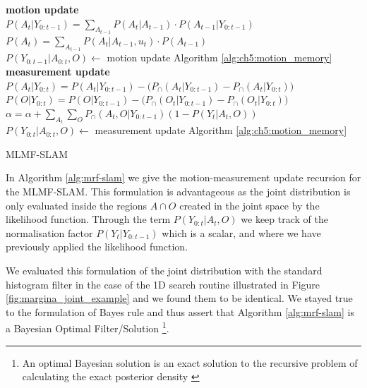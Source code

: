 \begin{center}
\begin{minipage}{\linewidth}

\begin{algorithm}[H]
\label{alg:mrf-slam}
\BlankLine
\textbf{motion update}\\
$P(A_t|Y_{0:t-1})  = \sum\limits_{A_{t-1}} P(A_t|A_{t-1}) \cdot P(A_{t-1}|Y_{0:t-1})$\\
$P(A_t)  = \sum\limits_{A_{t-1}} P(A_t|A_{t-1},u_t) \cdot P(A_{t-1})$\\
$P(Y_{0:t-1}|A_{0:t},O) \gets$ motion update Algorithm \ref{alg:ch5:motion_memory} 
\BlankLine
\textbf{measurement update}
\BlankLine
$P(A_t|Y_{0:t}) = P(A_t|Y_{0:t-1}) - \Big(P_{\cap}(A_t|Y_{0:t-1}) -  P_{\cap}(A_t|Y_{0:t}) \Big)$  \\
$P(O|Y_{0:t}) = P(O|Y_{0:t-1}) -  \Big(  P_{\cap}(O_t|Y_{0:t-1}) -  P_{\cap}(O_t|Y_{0:t})\Big)$    \\
$\alpha = \alpha +  \sum\limits_{A_t}\sum\limits_{O} P_{\cap}(A_t,O|Y_{0:t-1}) (1 - P(Y_t|A_t,O))$ \\
$P(Y_{0:t}|A_{0:t},O) \gets$ measurement update Algorithm \ref{alg:ch5:motion_memory} 
\caption{MLMF-SLAM}
\end{algorithm} 
\end{minipage}
\end{center}
In Algorithm \ref{alg:mrf-slam} we give the motion-measurement update recursion for the MLMF-SLAM.
This formulation is advantageous as the joint distribution is only evaluated inside the regions 
$A\cap O$ created in the joint space by the likelihood function. Through the term $P(Y_{0:t}|A_t,O)$ we keep 
track of the normalisation factor $P(Y_t|Y_{0:t-1})$ which 
is a scalar, and where we have previously applied the likelihood function. 

We evaluated this formulation of the joint distribution with the standard histogram filter in the case of the 1D search routine 
illustrated in Figure \ref{fig:margina_joint_example} and we found them to be identical. We stayed true to the formulation of Bayes rule 
and thus assert that Algorithm \ref{alg:mrf-slam} is a Bayesian Optimal Filter/Solution
\footnote{An optimal Bayesian solution is an exact solution to the recursive problem of calculating the exact posterior density 
\cite{PF_tutorial_2002}}.

